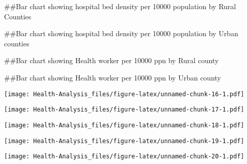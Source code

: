 \documentclass[
]{article}
\begin{document}
\#\#Bar chart showing hospital bed density per 10000 population by Rural
Counties

\#\#Bar chart showing hospital bed density per 10000 population by Urban
counties

\#\#Bar chart showing Health worker per 10000 ppn by Rural county

\#\#Bar chart showing Health worker per 10000 ppn by Urban county

\texttt{[image: Health-Analysis\_files/figure-latex/unnamed-chunk-16-1.pdf]}

\texttt{[image: Health-Analysis\_files/figure-latex/unnamed-chunk-17-1.pdf]}

\texttt{[image: Health-Analysis\_files/figure-latex/unnamed-chunk-18-1.pdf]}

\texttt{[image: Health-Analysis\_files/figure-latex/unnamed-chunk-19-1.pdf]}

\texttt{[image: Health-Analysis\_files/figure-latex/unnamed-chunk-20-1.pdf]}
\end{document}
